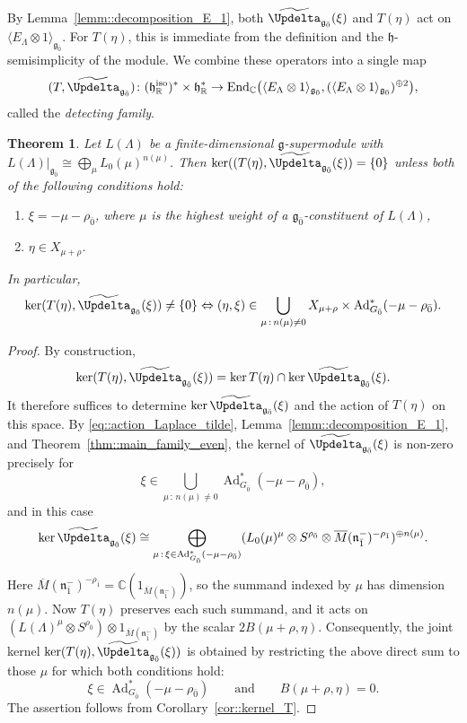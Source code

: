 \documentclass[11pt]{amsart}
\newcommand{\End}{\operatorname{End}}
\def\CC{{\mathbb C}}
\def\RR{{\mathbb R}}
\def\hh{{\mathfrak h}}
\def\even{{\mathfrak{g}_{\bar{0}}}}
\def\nn {{\mathfrak{n}}}
\def\gg{{\mathfrak{g}}}
\newcommand{\Ad}{\operatorname{Ad}}
\theoremstyle{plain}
\newtheorem{theorem}{Theorem}
\theoremstyle{remark}
\theoremstyle{definition}
\numberwithin{equation}{section}
\theoremstyle{remark}
\begin{document}
By Lemma~\ref{lemm::decomposition_E_1}, both $\widetilde{\Updelta}_{\even}(\xi)$ and $T(\eta)$ act on $\langle E_{\Lambda}\otimes 1\rangle_{\even}$. For $T(\eta)$, this is immediate from the definition and the $\hh$-semisimplicity of the module. We combine these operators into a single map
\begin{equation}
(T,\widetilde{\Updelta}_{\even})\colon(\hh_{\RR}^{\text{iso}})^{\ast}\times\hh_{\RR}^{\ast}\to \End_{\CC}\bigl(\langle E_{\Lambda}\otimes 1\rangle_{\even},(\langle E_{\Lambda}\otimes 1\rangle_{\even})^{\oplus 2}\bigr),
\end{equation}
called the \emph{detecting family}.

\begin{theorem}\label{thm::main_resul_family_tuple}
Let $L(\Lambda)$ be a finite-dimensional $\gg$-supermodule with $L(\Lambda)\vert_{\even}\cong \bigoplus_{\mu}L_{0}(\mu)^{n(\mu)}$. Then
$\ker((T(\eta),\widetilde{\Updelta}_{\even}(\xi))=\{0\}$ unless both of the following conditions hold:
\begin{enumerate}
\item[a)] $\xi=-\mu-\rho_{\bar{0}}$, where $\mu$ is the highest weight of a $\even$-constituent of $L(\Lambda)$,
\item[b)] $\eta\in X_{\mu+\rho}$.
\end{enumerate}
In particular,
\[
\ker (T(\eta), \widetilde{\Updelta}_{\even}(\xi)) \neq \{0\} \Leftrightarrow (\eta,\xi) \in \bigcup_{\mu\,:\,n(\mu)\neq 0}X_{\mu+\rho} \times \Ad_{G_{\bar{0}}}^{\ast}(-\mu-\rho_{\bar{0}}).
\]
\end{theorem}

\begin{proof}
By construction,
\[
\ker(T(\eta),\widetilde{\Updelta}_{\even}(\xi))=\ker T(\eta)\cap\ker \widetilde{\Updelta}_{\even}(\xi).
\]
It therefore suffices to determine $\ker \widetilde{\Updelta}_{\even}(\xi)$ and the action of $T(\eta)$ on this space. By \eqref{eq::action_Laplace_tilde}, Lemma~\ref{lemm::decomposition_E_1}, and Theorem~\ref{thm::main_family_even}, the kernel of $\widetilde{\Updelta}_{\even}(\xi)$ is non-zero precisely for
\[
\xi\in \bigcup_{\mu\,:\,n(\mu)\neq 0}\Ad_{G_{\bar{0}}}^{\ast}(-\mu-\rho_{\bar{0}}),
\]
and in this case
\[
\ker \widetilde{\Updelta}_{\even}(\xi)\cong \bigoplus_{\mu\,:\,\xi\in \Ad_{G_{\bar{0}}}^{\ast}(-\mu-\rho_{\bar{0}})}
(L_{0}(\mu)^{\mu}\otimes S^{\rho_{\bar{0}}}\otimes \overline{M}(\nn_{\bar{1}}^{-})^{-\rho_{\bar{1}}})^{ \oplus n(\mu)}.
\]
Here $\overline{M}(\nn_{\bar{1}}^{-})^{-\rho_{\bar{1}}}=\CC (1_{\overline{M}(\nn_{\bar{1}}^{-})})$, so the summand indexed by $\mu$ has dimension $n(\mu)$. Now $T(\eta)$ preserves each such summand, and it acts on
$
(L(\Lambda)^{\mu}\otimes S^{\rho_{\bar{0}}})\otimes 1_{\overline{M}(\nn_{\bar{1}}^{-})}
$ by the scalar $2B(\mu+\rho,\eta)$. Consequently, the joint kernel
$
\ker(T(\eta),\widetilde{\Updelta}_{\even}(\xi))
$
is obtained by restricting the above direct sum to those $\mu$ for which both conditions hold:
\[
\xi\in \Ad_{G_{\bar{0}}}^{\ast}(-\mu-\rho_{\bar{0}})
\qquad\text{and}\qquad
B(\mu+\rho,\eta)=0.
\]
The assertion follows from Corollary~\ref{cor::kernel_T}.
\end{proof}
\end{document}
